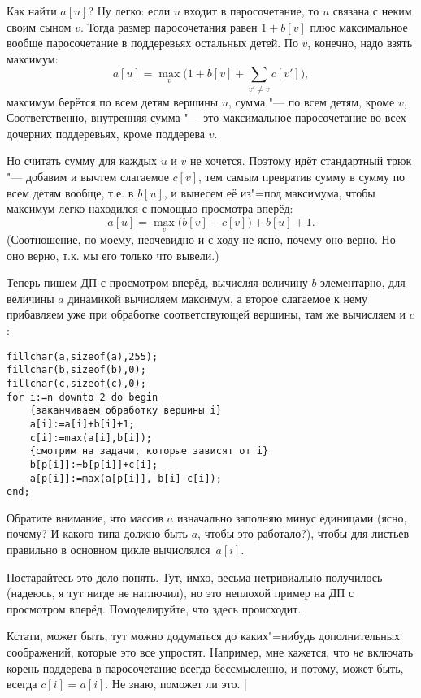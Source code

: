 Как найти $a[u]$? Ну легко: если $u$ входит в паросочетание, то $u$ связана с неким своим сыном 
$v$. Тогда размер паросочетания равен $1+b[v]$ плюс максимальное вообще паросочетание в поддеревьях 
остальных детей. По $v$, конечно, надо взять максимум:
$$
a[u]=\max_v \bigg(1+b[v]+\sum_{v'\neq v} c[v']\bigg),
$$
максимум берётся по всем детям вершины $u$, сумма "--- по всем детям, кроме $v$, 
Соответственно, внутренняя сумма "--- это максимальное паросочетание во всех дочерних поддеревьях, 
кроме поддерева $v$.

Но считать сумму для каждых $u$ и $v$ не хочется. Поэтому идёт стандартный трюк "--- добавим и 
вычтем слагаемое $c[v]$, тем самым превратив сумму в сумму по всем детям вообще, т.е. в $b[u]$, и 
вынесем её из"=под максимума, чтобы максимум легко находился с помощью просмотра вперёд:
$$
a[u]=\max_v \Big(b[v]-c[v]\Big)+b[u]+1.
$$
(Соотношение, по-моему, неочевидно и с ходу не ясно, почему оно верно. Но оно верно, т.к. мы его 
только что вывели.)

Теперь пишем ДП с просмотром вперёд, вычисляя величину $b$ элементарно, для величины $a$ динамикой 
вычисляем максимум, а второе слагаемое к нему прибавляем уже при обработке соответствующей вершины, там же вычисляем и $c$: 
\begin{codesampleo}\begin{verbatim}
fillchar(a,sizeof(a),255); 
fillchar(b,sizeof(b),0);
fillchar(c,sizeof(c),0);
for i:=n downto 2 do begin
    {заканчиваем обработку вершины i}
    a[i]:=a[i]+b[i]+1;
    c[i]:=max(a[i],b[i]);
    {смотрим на задачи, которые зависят от i}
    b[p[i]]:=b[p[i]]+c[i];
    a[p[i]]:=max(a[p[i]], b[i]-c[i]);
end;
\end{verbatim}\end{codesampleo}
Обратите внимание, что массив $a$ изначально заполняю минус единицами (ясно, почему? И какого типа должно быть $a$, чтобы это работало?), чтобы для 
листьев правильно в основном цикле вычислялся~$a[i]$.

Постарайтесь это дело понять. Тут, имхо, весьма нетривиально получилось (надеюсь, я тут нигде не 
наглючил), но это неплохой пример на ДП с просмотром вперёд. Помоделируйте, что здесь происходит.

Кстати, может быть, тут можно додуматься до каких"=нибудь дополнительных соображений, которые это все 
упростят. Например, мне кажется, что \textit{не} включать корень поддерева в паросочетание всегда 
бессмысленно, и потому, может быть, всегда $c[i]=a[i]$. Не знаю, поможет ли это.
|

